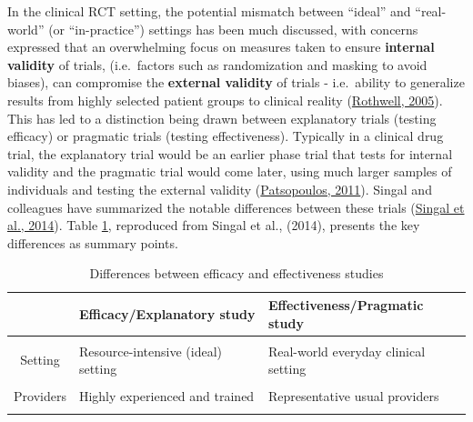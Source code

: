 \documentclass{krantz}
\begin{document}
In the clinical RCT setting, the potential mismatch between ``ideal'' and ``real-world'' (or ``in-practice'') settings has been much discussed, with concerns expressed that an overwhelming focus on measures taken to ensure \textbf{internal validity} of trials, (i.e.~factors such as randomization and masking to avoid biases), can compromise the \textbf{external validity} of trials - i.e.~ability to generalize results from highly selected patient groups to clinical reality (\protect\hyperlink{ref-rothwell2005}{Rothwell, 2005}). This has led to a distinction being drawn between explanatory trials (testing efficacy) or pragmatic trials (testing effectiveness). Typically in a clinical drug trial, the explanatory trial would be an earlier phase trial that tests for internal validity and the pragmatic trial would come later, using much larger samples of individuals and testing the external validity (\protect\hyperlink{ref-patsopoulos2011}{Patsopoulos, 2011}). Singal and colleagues have summarized the notable differences between these trials (\protect\hyperlink{ref-singal2014}{Singal et al., 2014}). Table \ref{tab:diffeff}, reproduced from Singal et al., (2014), presents the key differences as summary points.

\begin{table}

\caption{\label{tab:diffeff}Differences between efficacy and effectiveness studies}
\centering
\begin{tabular}[t]{c>{\centering\arraybackslash}p{13em}>{\centering\arraybackslash}p{13em}}
\toprule
  & Efficacy/Explanatory study & Effectiveness/Pragmatic study\\
\midrule
\cellcolor{gray!6}{Question} & \cellcolor{gray!6}{Does the intervention work under ideal circumstances?} & \cellcolor{gray!6}{Does the intervention work in real-world practice?}\\
Setting & Resource-intensive (ideal) setting & Real-world everyday clinical setting\\
\cellcolor{gray!6}{Study population} & \cellcolor{gray!6}{Highly selected, homogenous population (Several exclusion criteria)} & \cellcolor{gray!6}{Heterogeneous population (Few to no exclusion criteria)}\\
Providers & Highly experienced and trained & Representative usual providers\\
\cellcolor{gray!6}{Intervention} & \cellcolor{gray!6}{Strictly enforced and standardized. No concurrent interventions} & \cellcolor{gray!6}{Applied with flexibility. Concurrent interventions and cross-over permitted}\\
\bottomrule
\end{tabular}
\end{table}
\end{document}
